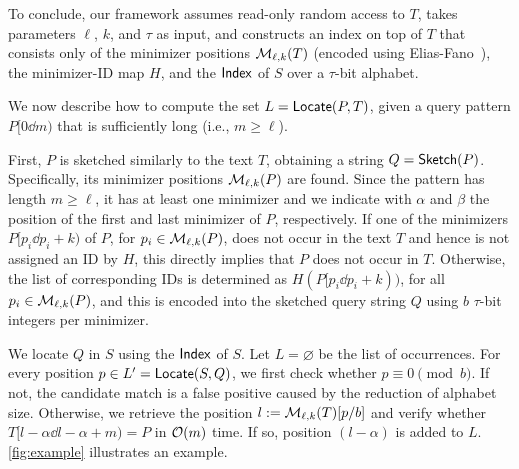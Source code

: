 
To conclude, our framework assumes read-only random access to $T$, takes
parameters $\ell$, $k$, and $\tau$ as input, and constructs an index on top of
$T$ that consists only of the minimizer positions $\mathcal{M}_{\ell,k}(T)$ (encoded
using Elias-Fano~\cite{Elias74,Fano71}), the minimizer-ID map $H$, and the $\textup{\textsf{Index}}$ of $S$ over a $\tau$-bit alphabet.

We now describe how to compute the set $L=\textup{\textsf{Locate}}(P,T)$, given a query pattern
$P[0\dd m)$ that is sufficiently long (i.e., $m\geq \ell$).

First, $P$ is sketched similarly to the text $T$, obtaining a string $Q=\textup{\textsf{Sketch}}(P)$.
Specifically, its minimizer positions
$\mathcal{M}_{\ell,k}(P)$ are found. Since the pattern has length $m \geq \ell$,
it has at least one minimizer and we indicate with $\alpha$ and $\beta$ the position
of the first and last minimizer of $P$, respectively. If one of the minimizers $P[p_i\dd p_i+k)$ of $P$, for $p_i\in \mathcal{M}_{\ell,k}(P)$, 
does not occur in the text $T$ and hence is not assigned
an ID by $H$, this directly implies that $P$ does not occur in $T$.
Otherwise, the list of corresponding IDs is determined as
$H(P[p_i \dd p_i+k))$, 
for all $p_i\in \mathcal{M}_{\ell,k}(P)$, and this is encoded into the
sketched query string $Q$ using $b$ $\tau$-bit integers per minimizer.


We locate $Q$ in $S$ using the $\textup{\textsf{Index}}$ of $S$. Let $L=\varnothing$ be the list
of occurrences.
For every position
$p \in L' = \textup{\textsf{Locate}}(S, Q)$, we first check whether $p \equiv 0 \pmod b$.
If not, the candidate match is a false positive caused by the reduction of alphabet
size. Otherwise, we retrieve the position $l:=\mathcal{M}_{\ell,k}(T)[p/b]$ and verify whether $T[l-\alpha \dd l-\alpha + m)=P$ in $\mathcal{O}(m)$ time.
If so, position $(l-\alpha)$ is added to $L$.
\cref{fig:example} illustrates an example.

